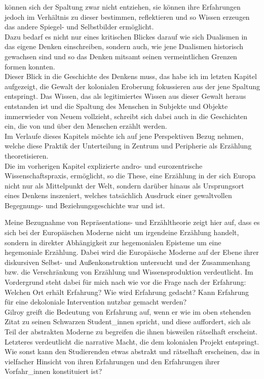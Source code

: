 können sich der Spaltung zwar nicht entziehen, sie können ihre Erfahrungen
jedoch im Verhältnis zu dieser bestimmen, reflektieren und so Wissen erzeugen
das andere Spiegel- und Selbstbilder ermöglicht. \\
Dazu bedarf es nicht nur eines
kritischen Blickes darauf wie sich Dualismen in das eigene Denken einschreiben,
sondern auch, wie jene Dualismen historisch gewachsen sind und so das Denken
mitsamt seinen vermeintlichen Grenzen formen konnten. 
\\
Dieser Blick in die
Geschichte des Denkens muss, das habe ich im letzten Kapitel aufgezeigt, die
Gewalt der kolonialen Eroberung fokussieren aus der jene Spaltung entspringt.
Das Wissen, das als legitimiertes Wissen aus dieser Gewalt heraus entstanden
ist und die Spaltung des Menschen in Subjekte und Objekte immerwieder von Neuem
vollzieht, schreibt sich dabei auch in die Geschichten ein, die von und über den Menschen erzählt werden.
\\

Im Verlaufe dieses Kapitels möchte ich auf jene Perspektiven Bezug nehmen,
welche diese Praktik der Unterteilung in Zentrum und Peripherie als Erzählung
theoretisieren. \\
Die im vorherigen Kapitel explizierte andro- und eurozentrische
Wissenschaftspraxis, ermöglicht, so die These, eine Erzählung in der sich
Europa nicht nur als Mittelpunkt der Welt, sondern darüber hinaus als
Ursprungsort eines Denkens inszeniert, welches tatsächlich Ausdruck einer
gewaltvollen Begegnungs- und Beziehungsgeschichte war und ist. 

Meine
Bezugnahme von Repräsentations- und Erzähltheorie zeigt hier auf, dass es sich
bei der Europäischen Moderne nicht um irgendeine Erzählung handelt, sondern in
direkter Abhängigkeit zur hegemonialen Episteme um eine hegemoniale Erzählung.
Dabei wird die Europäische Moderne auf der Ebene ihrer diskursiven Selbst- und
Außenkonstruktion untersucht und der Zusammenhang bzw. die Verschränkung von
Erzählung und Wissensproduktion verdeutlicht. Im Vordergrund steht dabei für
mich nach wie vor die Frage nach der Erfahrung: \\
Welchen Ort erhält Erfahrung?
Wie wird Erfahrung gedacht? Kann Erfahrung für eine dekoloniale Intervention
nutzbar gemacht werden?
\\

Gilroy greift die Bedeutung von Erfahrung auf, wenn er wie im oben stehenden
Zitat zu seinen Schwarzen Student\_innen spricht, und diese auffordert, sich als
Teil der \glqq abstrakten Moderne \grqq\footnotemark {} zu begreifen die ihnen bisweilen \glqq rätselhaft
\grqq\footnotemark {}
erscheint. Letzteres verdeutlicht die narrative Macht, die dem kolonialen
Projekt entspringt. Wie sonst kann den Studierenden etwas abstrakt und
rätselhaft erscheinen, das in vielfacher Hinsicht von ihren Erfahrungen und den
Erfahrungen ihrer Vorfahr\_innen konstituiert ist? 

